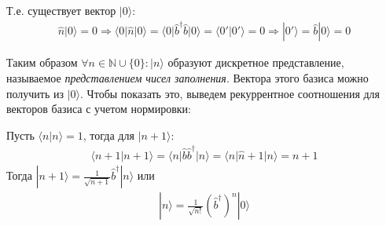 Т.е. существует вектор $|0\rangle$:
\begin{gather*}
\hat{n}|0\rangle = 0
\Longrightarrow
\langle 0|\hat{n}|0\rangle = \langle 0|\hat{b}^\dagger\hat{b}|0\rangle = \langle 0'|0'\rangle = 0
\Longrightarrow
|0'\rangle = \hat{b}|0\rangle = 0
\end{gather*}

Таким образом $\forall n\in\mathbb{N}\cup\{0\}\colon|n\rangle$ образуют дискретное представление, называемое \textit{представлением чисел заполнения}. Вектора этого базиса можно получить из $|0\rangle$. Чтобы показать это, выведем рекуррентное соотношения для векторов базиса с учетом нормировки:

Пусть $\langle n|n\rangle=1$, тогда для $|n+1\rangle$:
\begin{gather*}
\langle n+1|n+1\rangle = \langle n|\hat{b}\hat{b}^\dagger|n\rangle = \langle n|\hat{n}+1|n\rangle
= n+1
\end{gather*}
Тогда $|n+1\rangle = \frac{1}{\sqrt{n+1}}\hat{b}^\dagger|n\rangle$ или
\begin{gather*}
|n\rangle = \frac{1}{\sqrt{n!}}\left(\hat{b}^\dagger\right)^n|0\rangle
\end{gather*}

